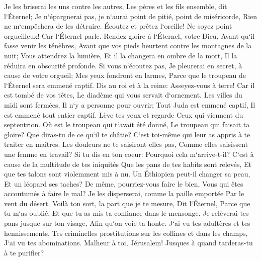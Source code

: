 \verse Je les briserai les uns contre les autres, Les pères et les fils ensemble, dit l`Éternel; Je n`épargnerai pas, je n`aurai point de pitié, point de miséricorde, Rien ne m`empêchera de les détruire. 
\verse Écoutez et prêtez l`oreille! Ne soyez point orgueilleux! Car l`Éternel parle. 
\verse Rendez gloire à l`Éternel, votre Dieu, Avant qu`il fasse venir les ténèbres, Avant que vos pieds heurtent contre les montagnes de la nuit; Vous attendrez la lumière, Et il la changera en ombre de la mort, Il la réduira en obscurité profonde. 
\verse Si vous n`écoutez pas, Je pleurerai en secret, à cause de votre orgueil; Mes yeux fondront en larmes, Parce que le troupeau de l`Éternel sera emmené captif. 
\verse Dis au roi et à la reine: Asseyez-vous à terre! Car il est tombé de vos têtes, Le diadème qui vous servait d`ornement. 
\verse Les villes du midi sont fermées, Il n`y a personne pour ouvrir; Tout Juda est emmené captif, Il est emmené tout entier captif. 
\verse Lève tes yeux et regarde Ceux qui viennent du septentrion. Où est le troupeau qui t`avait été donné, Le troupeau qui faisait ta gloire? 
\verse Que diras-tu de ce qu`il te châtie? C`est toi-même qui leur as appris à te traiter en maîtres. Les douleurs ne te saisiront-elles pas, Comme elles saisissent une femme en travail? 
\verse Si tu dis en ton coeur: Pourquoi cela m`arrive-t-il? C`est à cause de la multitude de tes iniquités Que les pans de tes habits sont relevés, Et que tes talons sont violemment mis à nu. 
\verse Un Éthiopien peut-il changer sa peau, Et un léopard ses taches? De même, pourriez-vous faire le bien, Vous qui êtes accoutumés à faire le mal? 
\verse Je les disperserai, comme la paille emportée Par le vent du désert. 
\verse Voilà ton sort, la part que je te mesure, Dit l`Éternel, Parce que tu m`as oublié, Et que tu as mis ta confiance dans le mensonge. 
\verse Je relèverai tes pans jusque sur ton visage, Afin qu`on voie ta honte. 
\verse J`ai vu tes adultères et tes hennissements, Tes criminelles prostitutions sur les collines et dans les champs, J`ai vu tes abominations. Malheur à toi, Jérusalem! Jusques à quand tarderas-tu à te purifier? 


